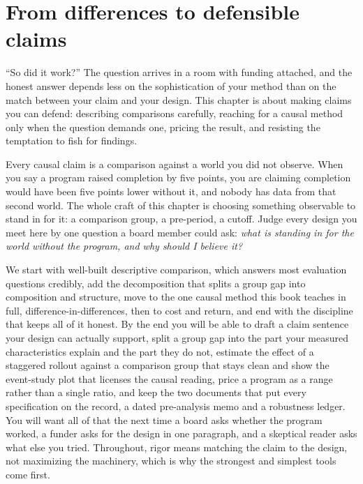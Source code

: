 \chapter{From differences to defensible claims}\label{ch:claims}

\enquote{So did it work?} The question arrives in a room with funding attached, and the honest answer depends less on the sophistication of your method than on the match between your claim and your design. This chapter is about making claims you can defend: describing comparisons carefully, reaching for a causal method only when the question demands one, pricing the result, and resisting the temptation to fish for findings.

Every causal claim is a comparison against a world you did not observe. When you say a program raised completion by five points, you are claiming completion would have been five points lower without it, and nobody has data from that second world. The whole craft of this chapter is choosing something observable to stand in for it: a comparison group, a pre-period, a cutoff. Judge every design you meet here by one question a board member could ask: \emph{what is standing in for the world without the program, and why should I believe it?}

We start with well-built descriptive comparison, which answers most evaluation questions credibly, add the decomposition that splits a group gap into composition and structure, move to the one causal method this book teaches in full, difference-in-differences, then to cost and return, and end with the discipline that keeps all of it honest. By the end you will be able to draft a claim sentence your design can actually support, split a group gap into the part your measured characteristics explain and the part they do not, estimate the effect of a staggered rollout against a comparison group that stays clean and show the event-study plot that licenses the causal reading, price a program as a range rather than a single ratio, and keep the two documents that put every specification on the record, a dated pre-analysis memo and a robustness ledger. You will want all of that the next time a board asks whether the program worked, a funder asks for the design in one paragraph, and a skeptical reader asks what else you tried. Throughout, rigor means matching the claim to the design, not maximizing the machinery, which is why the strongest and simplest tools come first.

